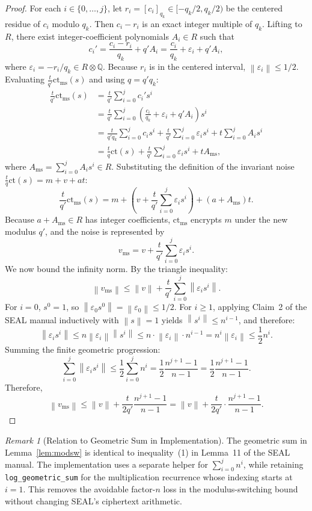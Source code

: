 \documentclass[11pt]{article}
\theoremstyle{definition}
\theoremstyle{remark}
\newtheorem{remark}{Remark}
\newcommand{\norm}[1]{\left\lVert #1\right\rVert}
\newcommand{\ct}{\mathrm{ct}}
\newcommand{\ctms}{\mathrm{ct}_{\mathrm{ms}}}
\newcommand{\vms}{v_{\mathrm{ms}}}
\newcommand{\Sgeo}[1]{\frac{n^{#1+1}-1}{n-1}}
\begin{document}
\begin{proof}
For each $i \in \{0, \dots, j\}$, let $r_i = [c_i]_{q_k} \in [-q_k/2, q_k/2)$ be the centered residue of $c_i$ modulo $q_k$.
Then $c_i - r_i$ is an exact integer multiple of $q_k$.
Lifting to $R$, there exist integer-coefficient polynomials $A_i \in R$ such that
\[
  c_i' = \frac{c_i - r_i}{q_k} + q' A_i = \frac{c_i}{q_k} + \varepsilon_i + q' A_i,
\]
where $\varepsilon_i = -r_i / q_k \in R \otimes \mathbb{Q}$.
Because $r_i$ is in the centered interval, $\norm{\varepsilon_i} \leq 1/2$.
Evaluating $\frac{t}{q'}\ctms(s)$ and using $q = q' q_k$:
\begin{align*}
  \frac{t}{q'}\ctms(s)
  &= \frac{t}{q'}\sum_{i=0}^j c_i' s^i\\
  &= \frac{t}{q'}\sum_{i=0}^j \left(\frac{c_i}{q_k} + \varepsilon_i + q' A_i\right) s^i\\
  &= \frac{t}{q' q_k}\sum_{i=0}^j c_i s^i + \frac{t}{q'}\sum_{i=0}^j \varepsilon_i s^i + t \sum_{i=0}^j A_i s^i\\
  &= \frac{t}{q}\ct(s) + \frac{t}{q'}\sum_{i=0}^j \varepsilon_i s^i + t A_{\mathrm{ms}},
\end{align*}
where $A_{\mathrm{ms}} = \sum_{i=0}^j A_i s^i \in R$.
Substituting the definition of the invariant noise $\frac{t}{q}\ct(s) = m + v + at$:
\[
  \frac{t}{q'}\ctms(s) = m + \left(v + \frac{t}{q'}\sum_{i=0}^j \varepsilon_i s^i\right) + (a + A_{\mathrm{ms}})t.
\]
Because $a + A_{\mathrm{ms}} \in R$ has integer coefficients, $\ctms$ encrypts $m$ under the new modulus $q'$, and the noise is represented by
\[
  \vms = v + \frac{t}{q'}\sum_{i=0}^j \varepsilon_i s^i.
\]
We now bound the infinity norm. By the triangle inequality:
\[
  \norm{\vms} \leq \norm{v} + \frac{t}{q'}\sum_{i=0}^j \norm{\varepsilon_i s^i}.
\]
For $i = 0$, $s^0 = 1$, so $\norm{\varepsilon_0 s^0} = \norm{\varepsilon_0} \leq 1/2$.
For $i \geq 1$, applying Claim~2 of the SEAL manual inductively with $\norm{s} = 1$ yields $\norm{s^i} \leq n^{i-1}$, and therefore:
\[
  \norm{\varepsilon_i s^i} \leq n \norm{\varepsilon_i} \norm{s^i} \leq n \cdot \norm{\varepsilon_i} \cdot n^{i-1} = n^i \norm{\varepsilon_i} \leq \frac{1}{2} n^i.
\]
Summing the finite geometric progression:
\[
  \sum_{i=0}^j \norm{\varepsilon_i s^i} \leq \frac{1}{2}\sum_{i=0}^j n^i = \frac{1}{2}\frac{n^{j+1}-1}{n-1} = \frac{1}{2}\Sgeo{j}.
\]
Therefore,
\[
  \norm{\vms} \leq \norm{v} + \frac{t}{2q'}\Sgeo{j} = \norm{v} + \frac{t}{2q'}\cdot\frac{n^{j+1}-1}{n-1}.
\]
\end{proof}

\begin{remark}[Relation to Geometric Sum in Implementation]
The geometric sum in Lemma~\ref{lem:modsw} is identical to inequality~(1) in Lemma~11 of the SEAL manual.
The implementation uses a separate helper for $\sum_{i=0}^{j} n^i$, while retaining
\texttt{log\_geometric\_sum} for the multiplication recurrence whose indexing starts at $i=1$.
This removes the avoidable factor-$n$ loss in the modulus-switching bound without changing
SEAL's ciphertext arithmetic.
\end{remark}
\end{document}
